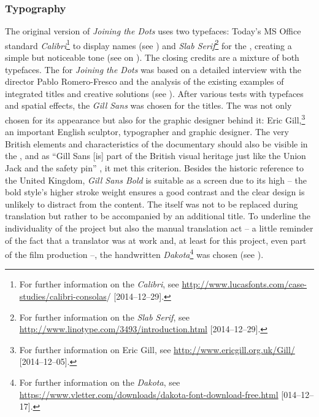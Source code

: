 \subsubsection{Typography}\label{sec:7.5.3.3}

The original version of \textit{Joining the Dots} uses two typefaces: Today’s MS Office standard  \textit{Calibri}\footnote{For further information on the  \textit{Calibri}, see \url{http://www.lucasfonts.com/case-studies/calibri-consolas}/ [2014--12--29].} to display names (see ) and \textit{Slab Serif}\footnote{For further information on the  \textit{Slab Serif}, see \url{http://www.linotype.com/3493/introduction.html} [2014--12--29].} for the , creating a simple but noticeable tone (see  on ). The closing credits are a mixture of both typefaces. The  for \textit{Joining the Dots} was based on a detailed interview with the director Pablo Romero-Fresco and the analysis of the existing examples of integrated titles and creative solutions (see ). After various  tests with typefaces and spatial effects, the  \textit{Gill Sans} was chosen for the titles. The  was not only chosen for its appearance but also for the graphic designer behind it: Eric Gill,\footnote{For further information on Eric Gill, see \url{http://www.ericgill.org.uk/Gill/} [2014--12--05].} an important English sculptor, typographer and graphic designer. The very British elements and characteristics of the documentary should also be visible in the , and as “Gill Sans [is] part of the British visual heritage just like the Union Jack and the safety pin” \citep{Archer2007}, it met this criterion. Besides the historic reference to the United Kingdom, \textit{Gill Sans Bold} is suitable as a screen  due to its high  – the bold style’s higher stroke weight ensures a good contrast and the clear design is unlikely to distract from the content. The  itself was not to be replaced during translation but rather to be accompanied by an additional title. To underline the individuality of the project but also the manual translation act – a little reminder of the fact that a translator was at work and, at least for this project, even part of the film production –, the handwritten  \textit{Dakota}\footnote{For further information on the  \textit{Dakota}, see \url{https://www.vletter.com/downloads/dakota-font-download-free.html} [014--12--17].} was chosen (see ).


